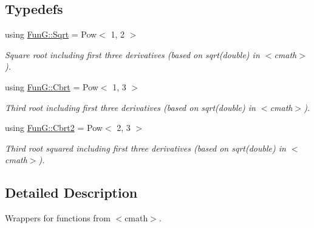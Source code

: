 \subsection*{Typedefs}
\begin{DoxyCompactItemize}
\item 
\hypertarget{group__CMathGroup_gaca80e773d5886f47cd49dc19b130263f}{using \hyperlink{group__CMathGroup_gaca80e773d5886f47cd49dc19b130263f}{Fun\-G\-::\-Sqrt} = Pow$<$ 1, 2 $>$}\label{group__CMathGroup_gaca80e773d5886f47cd49dc19b130263f}

\begin{DoxyCompactList}\small\item\em Square root including first three derivatives (based on sqrt(double) in $<$cmath$>$). \end{DoxyCompactList}\item 
\hypertarget{group__CMathGroup_ga2e4363ad8400e1c8431c10de2152ec2b}{using \hyperlink{group__CMathGroup_ga2e4363ad8400e1c8431c10de2152ec2b}{Fun\-G\-::\-Cbrt} = Pow$<$ 1, 3 $>$}\label{group__CMathGroup_ga2e4363ad8400e1c8431c10de2152ec2b}

\begin{DoxyCompactList}\small\item\em Third root including first three derivatives (based on sqrt(double) in $<$cmath$>$). \end{DoxyCompactList}\item 
\hypertarget{group__CMathGroup_ga9bcbef859d7ffd0d6570d69e1bd8503a}{using \hyperlink{group__CMathGroup_ga9bcbef859d7ffd0d6570d69e1bd8503a}{Fun\-G\-::\-Cbrt2} = Pow$<$ 2, 3 $>$}\label{group__CMathGroup_ga9bcbef859d7ffd0d6570d69e1bd8503a}

\begin{DoxyCompactList}\small\item\em Third root squared including first three derivatives (based on sqrt(double) in $<$cmath$>$). \end{DoxyCompactList}\end{DoxyCompactItemize}


\subsection{Detailed Description}
Wrappers for functions from $<$cmath$>$. 